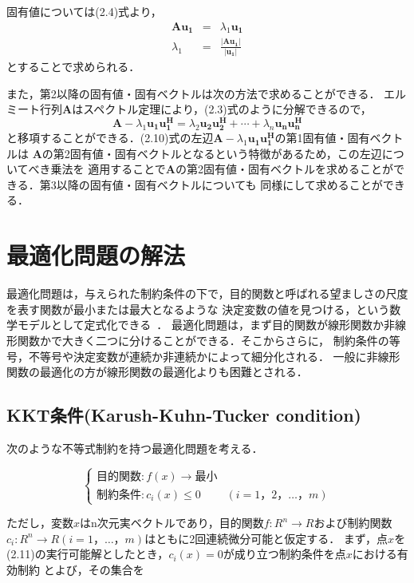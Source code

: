 固有値については(2.4)式より，
\begin{eqnarray}
    \bm{Au_1}&=&\lambda_1\bm{u_1} \nonumber \\
    \lambda_1&=&\frac{\left| \bm{Au_1} \right|}{\left| \bm{u_1} \right|}
\end{eqnarray}
とすることで求められる．

また，第2以降の固有値・固有ベクトルは次の方法で求めることができる．
エルミート行列$\bm{A}$はスペクトル定理により，(2.3)式のように分解できるので，
\begin{equation}
    \bm{A} - \lambda_1\bm{u_1}\bm{u_1^H} = \lambda_2\bm{u_2}\bm{u_2^H} + \cdots + \lambda_n\bm{u_n}\bm{u_n^H}
\end{equation}
と移項することができる．(2.10)式の左辺$\bm{A} - \lambda_1\bm{u_1}\bm{u_1^H}$の第1固有値・固有ベクトルは
$\bm{A}$の第2固有値・固有ベクトルとなるという特徴があるため，この左辺についてべき乗法を
適用することで$\bm{A}$の第2固有値・固有ベクトルを求めることができる．第3以降の固有値・固有ベクトルについても
同様にして求めることができる．

\section{最適化問題の解法}
最適化問題は，与えられた制約条件の下で，目的関数と呼ばれる望ましさの尺度を表す関数が最小または最大となるような
決定変数の値を見つける，という数学モデルとして定式化できる~\cite{ibaragi}．
最適化問題は，まず目的関数が線形関数か非線形関数かで大きく二つに分けることができる．そこからさらに，
制約条件の等号，不等号や決定変数が連続か非連続かによって細分化される．
一般に非線形関数の最適化の方が線形関数の最適化よりも困難とされる．

\subsection{KKT条件(Karush-Kuhn-Tucker condition)}
次のような不等式制約を持つ最適化問題を考える．

\begin{equation}
    \left\{
        \begin{array}{cc}
            目的関数:f(x) \to 最小 & \\
            制約条件:c_i(x) \leq 0 & (i=1，2，\ldots，m)
        \end{array}
    \right.
\end{equation}

ただし，変数$x$はn次元実ベクトルであり，目的関数$f:R^n \to R$および制約関数
$c_i:R^n \to R(i=1，\ldots，m)$はともに2回連続微分可能と仮定する．
まず，点$x$を(2.11)の実行可能解としたとき，$c_i(x)=0$が成り立つ制約条件を点$x$における有効制約
とよび，その集合を

